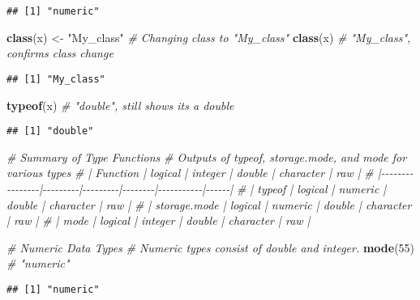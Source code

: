 \documentclass[
]{article}
\newenvironment{Shaded}{\begin{snugshade}}{\end{snugshade}}
\newcommand{\CommentTok}[1]{\textcolor[rgb]{0.56,0.35,0.01}{\textit{#1}}}
\newcommand{\DecValTok}[1]{\textcolor[rgb]{0.00,0.00,0.81}{#1}}
\newcommand{\FunctionTok}[1]{\textcolor[rgb]{0.13,0.29,0.53}{\textbf{#1}}}
\newcommand{\NormalTok}[1]{#1}
\newcommand{\OtherTok}[1]{\textcolor[rgb]{0.56,0.35,0.01}{#1}}
\newcommand{\StringTok}[1]{\textcolor[rgb]{0.31,0.60,0.02}{#1}}
\begin{document}
\begin{verbatim}
## [1] "numeric"
\end{verbatim}

\begin{Shaded}
\begin{Highlighting}[]
\FunctionTok{class}\NormalTok{(x) }\OtherTok{\textless{}{-}} \StringTok{"My\_class"}  \CommentTok{\# Changing class to "My\_class"}
\FunctionTok{class}\NormalTok{(x)                }\CommentTok{\# "My\_class", confirms class change}
\end{Highlighting}
\end{Shaded}

\begin{verbatim}
## [1] "My_class"
\end{verbatim}

\begin{Shaded}
\begin{Highlighting}[]
\FunctionTok{typeof}\NormalTok{(x)               }\CommentTok{\# "double", still shows it\textquotesingle{}s a double}
\end{Highlighting}
\end{Shaded}

\begin{verbatim}
## [1] "double"
\end{verbatim}

\begin{Shaded}
\begin{Highlighting}[]
\CommentTok{\# Summary of Type Functions}
\CommentTok{\# Outputs of typeof, storage.mode, and mode for various types}
\CommentTok{\# | Function       | logical | integer | double | character | raw  |}
\CommentTok{\# |{-}{-}{-}{-}{-}{-}{-}{-}{-}{-}{-}{-}{-}{-}{-}{-}|{-}{-}{-}{-}{-}{-}{-}{-}{-}|{-}{-}{-}{-}{-}{-}{-}{-}{-}|{-}{-}{-}{-}{-}{-}{-}{-}|{-}{-}{-}{-}{-}{-}{-}{-}{-}{-}{-}|{-}{-}{-}{-}{-}{-}|}
\CommentTok{\# | typeof         | logical | numeric | double | character | raw  |}
\CommentTok{\# | storage.mode   | logical | numeric | double | character | raw  |}
\CommentTok{\# | mode           | logical | integer | double | character | raw  |}

\CommentTok{\# Numeric Data Types}
\CommentTok{\# Numeric types consist of double and integer.}
\FunctionTok{mode}\NormalTok{(}\DecValTok{55}\NormalTok{)                }\CommentTok{\# "numeric"}
\end{Highlighting}
\end{Shaded}

\begin{verbatim}
## [1] "numeric"
\end{verbatim}
\end{document}
